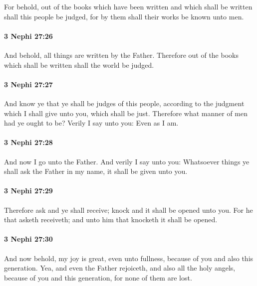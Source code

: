			For behold, out of the books
			which have been written and which shall be written
			shall this people be judged,
			for by them shall their works be known unto men.

		\paragraph{3 Nephi 27:26} %
			\label{3NEPHI-27-26}

			And behold, all things are written by the Father.
			Therefore out of the books which shall be written shall the world be judged.

		\paragraph{3 Nephi 27:27} %
			\label{3NEPHI-27-27}

			And know ye that ye shall be judges of this people,
			according to the judgment which I shall give unto you, which shall be just.
			Therefore what manner of men had ye ought to be?
			Verily I say unto you: Even as I am.

		\paragraph{3 Nephi 27:28} %
			\label{3NEPHI-27-28}

			And now I go unto the Father.
			And verily I say unto you:
			Whatsoever things ye shall ask the Father in my name,
			it shall be given unto you.

		\paragraph{3 Nephi 27:29} %
			\label{3NEPHI-27-29}

			Therefore ask and ye shall receive;
			knock and it shall be opened unto you.
			For he that asketh receiveth;
			and unto him that knocketh it shall be opened.

		\paragraph{3 Nephi 27:30} %
			\label{3NEPHI-27-30}

			And now behold, my joy is great, even unto fullness,
			because of you and also this generation.
			Yea, and even the Father rejoiceth, and also all the holy angels,
			because of you and this generation,
			for none of them are lost.

